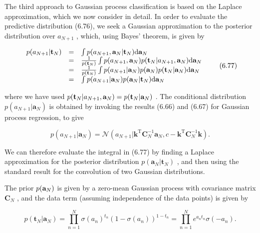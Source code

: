 \documentclass[
  10
]{article}
\begin{document}
The third approach to Gaussian process classification is based on the
Laplace approximation, which we now consider in detail. In order to
evaluate the predictive distribution (6.76), we seek a Gaussian
approximation to the posterior distribution over \(a _ { N + 1 }\) ,
which, using Bayes' theorem, is given by

\[
\begin{array}{l l l} p (a _ {N + 1} | \mathbf {t} _ {N}) & = & \int p (a _ {N + 1}, \mathbf {a} _ {N} | \mathbf {t} _ {N})   \mathrm{d} \mathbf {a} _ {N} \\ & = & \frac {1}{p (\mathbf {t} _ {N})} \int p (a _ {N + 1}, \mathbf {a} _ {N}) p (\mathbf {t} _ {N} | a _ {N + 1}, \mathbf {a} _ {N})   \mathrm{d} \mathbf {a} _ {N} \\ & = & \frac {1}{p (\mathbf {t} _ {N})} \int p (a _ {N + 1} | \mathbf {a} _ {N}) p (\mathbf {a} _ {N}) p (\mathbf {t} _ {N} | \mathbf {a} _ {N})   \mathrm{d} \mathbf {a} _ {N} \\ & = & \int p (a _ {N + 1} | \mathbf {a} _ {N}) p (\mathbf {a} _ {N} | \mathbf {t} _ {N})   \mathrm{d} \mathbf {a} _ {N} \end{array}\tag{6.77}
\]

where we have used
\(p ( { \bf t } _ { N } | a _ { N + 1 } , { \bf a } _ { N } ) = p ( { \bf t } _ { N } | { \bf a } _ { N } )\)
. The conditional distribution
\(p ( a _ { N + 1 } | \mathbf { a } _ { N } )\) is obtained by invoking
the results (6.66) and (6.67) for Gaussian process regression, to give

\[
p (a _ {N + 1} | \mathbf {a} _ {N}) = \mathcal {N} (a _ {N + 1} | \mathbf {k} ^ {\mathrm{T}} \mathbf {C} _ {N} ^ {- 1} \mathbf {a} _ {N}, c - \mathbf {k} ^ {\mathrm{T}} \mathbf {C} _ {N} ^ {- 1} \mathbf {k}).\tag{6.78}
\]

We can therefore evaluate the integral in (6.77) by finding a Laplace
approximation for the posterior distribution
\(p ( \mathbf { a } _ { N } | \mathbf { t } _ { N } )\) , and then using
the standard result for the convolution of two Gaussian distributions.

The prior \(p ( { \bf a } _ { N } )\) is given by a zero-mean Gaussian
process with covariance matrix \(\mathbf { C } _ { N }\) , and the data
term (assuming independence of the data points) is given by

\[
p (\mathbf {t} _ {N} | \mathbf {a} _ {N}) = \prod_ {n = 1} ^ {N} \sigma (a _ {n}) ^ {t _ {n}} (1 - \sigma (a _ {n})) ^ {1 - t _ {n}} = \prod_ {n = 1} ^ {N} e ^ {a _ {n} t _ {n}} \sigma (- a _ {n}).\tag{6.79}
\]
\end{document}
